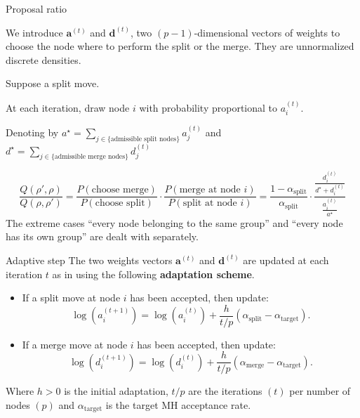 \begin{frame}{Proposal ratio}

We introduce $\bm{a}^{(t)}$ and $\bm{d}^{(t)}$, two $(p-1)$-dimensional vectors of \alert{weights} to choose the node where to perform the split or the merge. They are unnormalized discrete densities.

\pause

Suppose a split move.

\pause

At each iteration, \alert{draw} node $i$ with probability proportional to $a_{i}^{(t)}$.

\pause

Denoting by $a^{\star} = \sum_{j\in \{\text{admissible split nodes}\}}{a_{j}^{(t)}}$ and $d^{\star} = \sum_{j\in \{\text{admissible merge nodes}\}}{d_{j}^{(t)}}$

\pause

\[
    \frac{Q(\rho',\rho)}{Q(\rho,\rho')}
    =
    \frac{P(\text{choose merge})}{P(\text{choose split})}
    \cdot 
    \frac{P(\text{merge at node $i$})}{P(\text{split at node $i$})}
    =
    \frac{1-\alpha_{\text{split}}}{\alpha_{\text{split}}}
    \cdot
    \frac{\frac{d_{i}^{(t)}}{d^{\star}+d_{i}^{(t)}}}{\frac{a_{i}^{(t)}}{a^{\star}}}
\]
The extreme cases ``every node belonging to the same group'' and ``every node has its own group'' are dealt with separately.

\end{frame}

\begin{frame}{Adaptive step}
    The two weights vectors $\bm{a}^{(t)}$ and $\bm{d}^{(t)}$ are updated at each iteration $t$ as in \cite{bensonAdaptiveMCMCMultiple2018} using the following 
    \textbf{adaptation scheme}.

    \begin{itemize}
        \item If a \alert{split} move at node $i$ has been accepted, then update:
		\[
		\log (a_i^{(t+1)})=\log (a_i^{(t)})+\frac{h}{t/p}(\alpha_{\text{split}}-\alpha_{\text{target}}) .
		\]
        \item If a \alert{merge} move at node $i$ has been accepted, then update:
		\[
		\log (d_i^{(t+1)})=\log (d_i^{(t)})+\frac{h}{t/p}(\alpha_{\text{merge}}-\alpha_{\text{target}}) .
		\]
        \end{itemize}
Where $h>0$ is the initial adaptation, $t/p$ are the iterations $(t)$ per number of nodes $(p)$ and $\alpha_{\text{target}}$ is the target MH acceptance rate.

\end{frame}

